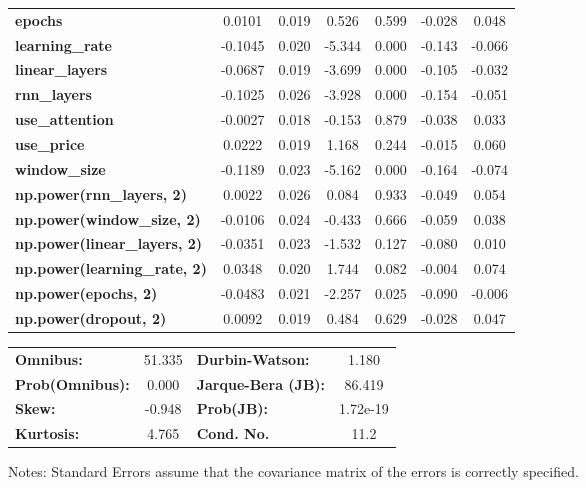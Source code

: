 \begin{center}
\begin{tabular}{lcccccc}
\textbf{epochs}                            &       0.0101  &        0.019     &     0.526  &         0.599        &       -0.028    &        0.048     \\
\textbf{learning\_rate}                    &      -0.1045  &        0.020     &    -5.344  &         0.000        &       -0.143    &       -0.066     \\
\textbf{linear\_layers}                    &      -0.0687  &        0.019     &    -3.699  &         0.000        &       -0.105    &       -0.032     \\
\textbf{rnn\_layers}                       &      -0.1025  &        0.026     &    -3.928  &         0.000        &       -0.154    &       -0.051     \\
\textbf{use\_attention}                    &      -0.0027  &        0.018     &    -0.153  &         0.879        &       -0.038    &        0.033     \\
\textbf{use\_price}                        &       0.0222  &        0.019     &     1.168  &         0.244        &       -0.015    &        0.060     \\
\textbf{window\_size}                      &      -0.1189  &        0.023     &    -5.162  &         0.000        &       -0.164    &       -0.074     \\
\textbf{np.power(rnn\_layers, 2)}          &       0.0022  &        0.026     &     0.084  &         0.933        &       -0.049    &        0.054     \\
\textbf{np.power(window\_size, 2)}         &      -0.0106  &        0.024     &    -0.433  &         0.666        &       -0.059    &        0.038     \\
\textbf{np.power(linear\_layers, 2)}       &      -0.0351  &        0.023     &    -1.532  &         0.127        &       -0.080    &        0.010     \\
\textbf{np.power(learning\_rate, 2)}       &       0.0348  &        0.020     &     1.744  &         0.082        &       -0.004    &        0.074     \\
\textbf{np.power(epochs, 2)}               &      -0.0483  &        0.021     &    -2.257  &         0.025        &       -0.090    &       -0.006     \\
\textbf{np.power(dropout, 2)}              &       0.0092  &        0.019     &     0.484  &         0.629        &       -0.028    &        0.047     \\
\bottomrule
\end{tabular}
\begin{tabular}{lclc}
\textbf{Omnibus:}       & 51.335 & \textbf{  Durbin-Watson:     } &    1.180  \\
\textbf{Prob(Omnibus):} &  0.000 & \textbf{  Jarque-Bera (JB):  } &   86.419  \\
\textbf{Skew:}          & -0.948 & \textbf{  Prob(JB):          } & 1.72e-19  \\
\textbf{Kurtosis:}      &  4.765 & \textbf{  Cond. No.          } &     11.2  \\
\bottomrule
\end{tabular}
\end{center}

Notes: \newline
 [1] Standard Errors assume that the covariance matrix of the errors is correctly specified.